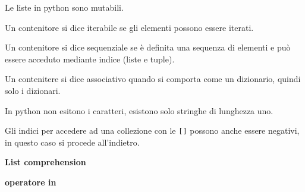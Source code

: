 Le liste in python sono mutabili.

Un contenitore si dice iterabile se gli elementi possono essere iterati.

Un contenitore si dice sequenziale se è definita una sequenza di
elementi e può essere acceduto mediante indice (liste e tuple).

Un contenitere si dice associativo quando si comporta come un
dizionario, quindi solo i dizionari.

In python non esitono i caratteri, esistono solo stringhe di lunghezza
uno.

Gli indici per accedere ad una collezione con le \texttt{{[}{]}} possono
anche essere negativi, in questo caso si procede all'indietro.


\textbf{List comprehension}


\textbf{operatore in}


